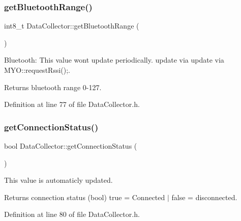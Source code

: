 \subsubsection{\texorpdfstring{get\+Bluetooth\+Range()}{getBluetoothRange()}}
{\footnotesize\ttfamily int8\+\_\+t Data\+Collector\+::get\+Bluetooth\+Range (\begin{DoxyParamCaption}{ }\end{DoxyParamCaption})\hspace{0.3cm}{\ttfamily [inline]}}



Bluetooth\+: This value wont update periodically. update via update via M\+Y\+O\+::request\+Rssi();. 

\begin{DoxyReturn}{Returns}
bluetooth range 0-\/127. 
\end{DoxyReturn}


Definition at line 77 of file Data\+Collector.\+h.

\mbox{\label{class_data_collector_a2dbac95176fb77c1714573e41ba4490f}} 
\subsubsection{\texorpdfstring{get\+Connection\+Status()}{getConnectionStatus()}}
{\footnotesize\ttfamily bool Data\+Collector\+::get\+Connection\+Status (\begin{DoxyParamCaption}{ }\end{DoxyParamCaption})\hspace{0.3cm}{\ttfamily [inline]}}



This value is automaticly updated. 

\begin{DoxyReturn}{Returns}
connection status (bool) true = Connected $\vert$ false = disconnected. 
\end{DoxyReturn}


Definition at line 80 of file Data\+Collector.\+h.

\mbox{\label{class_data_collector_a6994bc51d1e7cbcaeca954a4ba7f8103}} 
